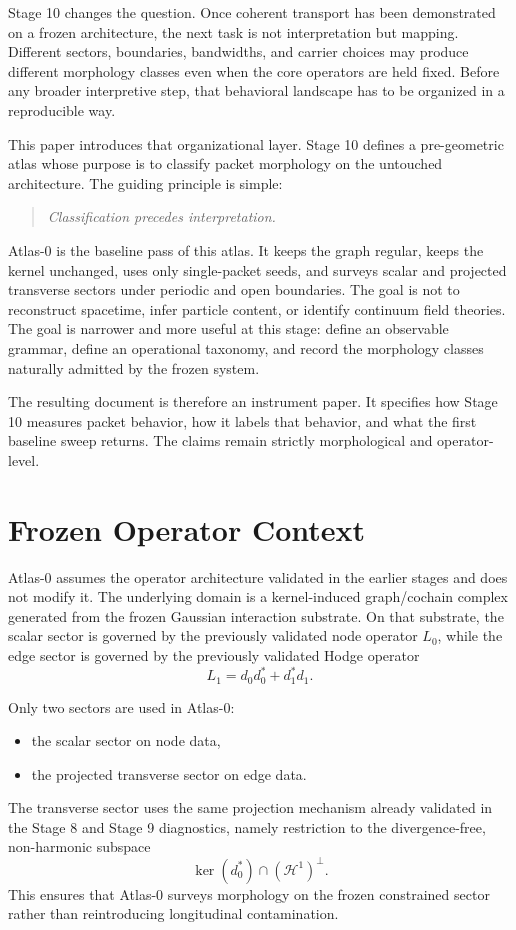 \documentclass[11pt]{article}
\begin{document}
Stage 10 changes the question. Once coherent transport has been demonstrated on a frozen architecture, the next task is not interpretation but mapping. Different sectors, boundaries, bandwidths, and carrier choices may produce different morphology classes even when the core operators are held fixed. Before any broader interpretive step, that behavioral landscape has to be organized in a reproducible way.

This paper introduces that organizational layer. Stage 10 defines a pre-geometric atlas whose purpose is to classify packet morphology on the untouched architecture. The guiding principle is simple:
\begin{quote}
\emph{Classification precedes interpretation.}
\end{quote}

Atlas-0 is the baseline pass of this atlas. It keeps the graph regular, keeps the kernel unchanged, uses only single-packet seeds, and surveys scalar and projected transverse sectors under periodic and open boundaries. The goal is not to reconstruct spacetime, infer particle content, or identify continuum field theories. The goal is narrower and more useful at this stage: define an observable grammar, define an operational taxonomy, and record the morphology classes naturally admitted by the frozen system.

The resulting document is therefore an instrument paper. It specifies how Stage 10 measures packet behavior, how it labels that behavior, and what the first baseline sweep returns. The claims remain strictly morphological and operator-level.

\section{Frozen Operator Context}
Atlas-0 assumes the operator architecture validated in the earlier stages and does not modify it. The underlying domain is a kernel-induced graph/cochain complex generated from the frozen Gaussian interaction substrate. On that substrate, the scalar sector is governed by the previously validated node operator $L_0$, while the edge sector is governed by the previously validated Hodge operator
\begin{equation}
L_1 = d_0 d_0^{*} + d_1^{*} d_1.
\end{equation}

Only two sectors are used in Atlas-0:
\begin{itemize}
\item the scalar sector on node data,
\item the projected transverse sector on edge data.
\end{itemize}
The transverse sector uses the same projection mechanism already validated in the Stage 8 and Stage 9 diagnostics, namely restriction to the divergence-free, non-harmonic subspace
\begin{equation}
\ker(d_0^{*}) \cap (\mathcal{H}^1)^\perp.
\end{equation}
This ensures that Atlas-0 surveys morphology on the frozen constrained sector rather than reintroducing longitudinal contamination.
\end{document}
